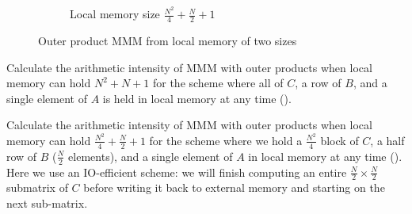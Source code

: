 \documentclass[a4 paper]{article}
\begin{document}
\begin{figure}[H]
\begin{subfigure}{.5\textwidth}
  \caption{Local memory size  $\frac{N^2}{4} + \frac{N}{2} + 1$}
  \label{fig:outermm_n2_4}
\end{subfigure}
\caption{Outer product MMM from local memory of two sizes}
\label{fig:outermm}
\end{figure}


Calculate the arithmetic intensity of MMM with outer products when local memory can hold $N^2+N +1$ for the scheme where all of $C$, a row of $B$, and a single element of $A$ is held in local memory at any time ().


Calculate the arithmetic intensity of MMM with outer products when local memory can hold $\frac{N^2}{4} + \frac{N}{2} + 1$ for the scheme where we hold a $\frac{N^2}{4}$ block of $C$, a half row of $B$ ($\frac{N}{2}$ elements), and a single element of $A$ in local memory at any time ().
Here we use an IO-efficient scheme: we will finish computing an entire $\frac{N}{2} \times \frac{N}{2}$ submatrix of $C$ before writing it back to external memory and starting on the next sub-matrix.
\end{document}
